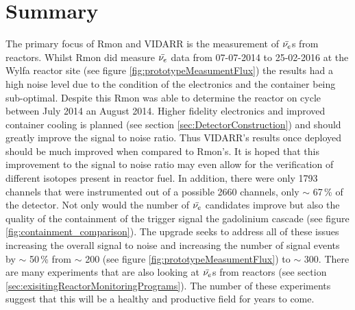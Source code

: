 
\chapter{Summary}

\ifpdf
    \graphicspath{{Chapter7/Figs/Raster/}{Chapter6/Figs/PDF/}{Chapter6/Figs/}}
\else
    \graphicspath{{Chapter7/Figs/Vector/}{Chapter7/Figs/}}
\fi

The primary focus of Rmon and VIDARR is the measurement of $\Bar{\nu_e}$s from reactors. Whilst Rmon did measure $\Bar{\nu_e}$ data from 07-07-2014 to 25-02-2016 at the Wylfa reactor site (see figure \ref{fig:prototypeMeasumentFlux}) the results had a high noise level due to the condition of the electronics and the container being sub-optimal. Despite this Rmon was able to determine the reactor on cycle between July 2014 an August 2014. Higher fidelity electronics and improved container cooling is planned (see section \ref{sec:DetectorConstruction}) and should greatly improve the signal to noise ratio. Thus VIDARR's results once deployed should be much improved when compared to Rmon's. It is hoped that this improvement to the signal to noise ratio may even allow for the verification of different isotopes present in reactor fuel. In addition, there were only 1793 channels that were instrumented out of a possible 2660 channels, only $\sim$ 67\,\% of the detector. Not only would the number of $\Bar{\nu_e}$ candidates improve but also the quality of the containment of the trigger signal the gadolinium cascade (see figure \ref{fig:containment_comparison}). The upgrade seeks to address all of these issues increasing the overall signal to noise and increasing the number of signal events by $\sim$ 50\,\% from $\sim$ 200 (see figure \ref{fig:prototypeMeasumentFlux}) to $\sim$ 300. There are many experiments that are also looking at $\Bar{\nu_e}$s from reactors (see section \ref{sec:exisitingReactorMonitoringPrograms}). The number of these experiments suggest that this will be a healthy and productive field for years to come.

